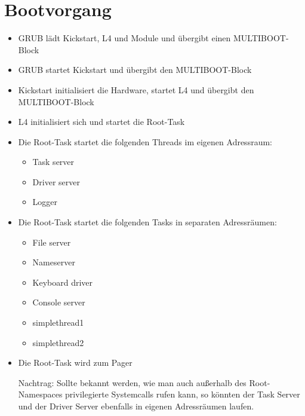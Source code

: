 \section{Bootvorgang}

\begin{itemize}
	\item GRUB lädt Kickstart, L4 und Module und übergibt einen MULTIBOOT-Block
	\item GRUB startet Kickstart und übergibt den MULTIBOOT-Block
	\item Kickstart initialisiert die Hardware, startet L4 und übergibt den MULTIBOOT-Block
	\item L4 initialisiert sich und startet die Root-Task

	\item Die Root-Task startet die folgenden Threads im eigenen Adressraum:
	\begin{itemize}
		\item Task server
		\item Driver server
		\item Logger
	\end{itemize}
	
	\item Die Root-Task startet die folgenden Tasks in separaten Adressräumen:
	\begin{itemize}
		\item File server
		\item Nameserver
		\item Keyboard driver
		\item Console server
		\item simplethread1
		\item simplethread2
	\end{itemize}
	
	\item Die Root-Task wird zum Pager
	
Nachtrag: Sollte bekannt werden, wie man auch außerhalb des Root-Namespaces privilegierte Systemcalls rufen kann, so könnten der Task Server und der Driver Server ebenfalls in eigenen Adressräumen laufen.
\end{itemize}